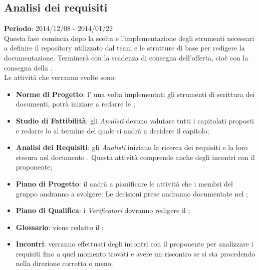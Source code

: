 	\subsection{Analisi dei requisiti} %
	\label{sub:analisi_dei_requisiti}
	\textbf{Periodo}: 2014/12/08 - 2014/01/22 \\
	Questa fase comincia dopo la scelta e l'implementazione degli strumenti necessari a definire il repository utilizzato dal team e le strutture di base per redigere la documentazione. Terminerà con la scadenza di consegna dell'offerta, cioè con la consegna della \RR. \\
	Le attività che verranno svolte sono:
		\begin{itemize}
			\item \textbf{Norme di Progetto}: l'\roleAdministrator{} una volta implementati gli strumenti di scrittura dei documenti, potrà iniziare a redarre le \docNameVersionNdP;
			\item \textbf{Studio di Fattibilità}: gli \emph{Analisti} devono valutare tutti i capitolati proposti e redarre lo \docNameVersionSdF{} al termine del quale si andrà a decidere il capitolo;
			\item \textbf{Analisi dei Requisiti}: gli \emph{Analisti} iniziano la ricerca dei requisiti e la loro stesura nel documento \docNameVersionAdR{}. Questa attività comprende anche degli incontri con il proponente;
			\item \textbf{Piano di Progetto}: il \roleProjectManager{} andrà a pianificare le attività che i membri del gruppo andranno a svolgere. Le decisioni prese andranno documentate nel \docNameVersionPdP;
			\item \textbf{Piano di Qualifica}: i \emph{Verificatori} dovranno redigere il \docNameVersionPdQ;
			\item \textbf{Glossario}: viene redatto il \docNameVersionGlo;
			\item \textbf{Incontri}: verranno effettuati degli incontri con il proponente per analizzare i requisiti fino a quel momento trovati e avere un riscontro se si sta procedendo nella direzione corretta o meno.
		\end{itemize}
	

